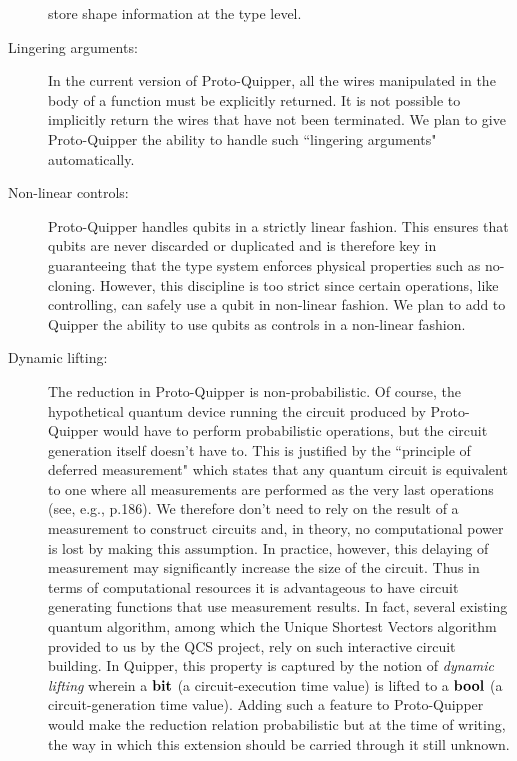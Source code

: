 \documentclass[twoside]{article}
\begin{document}
\begin{description}
    store shape information at the type level.
  \item[Lingering arguments:] In the current version of 
    Proto-Quipper, all the wires manipulated in the body of a function 
    must be explicitly returned. It is not possible to implicitly 
    return the wires that have not been terminated. We plan to 
    give Proto-Quipper the ability to handle such ``lingering 
    arguments" automatically.
  \item[Non-linear controls:] Proto-Quipper handles qubits 
    in a strictly linear fashion. This ensures that qubits are 
    never discarded or duplicated and is therefore key in 
    guaranteeing that the type system enforces physical properties 
    such as no-cloning. However, this discipline is too strict since 
    certain operations, like controlling, can safely use a qubit in 
    non-linear fashion. We plan to add to Quipper the ability to 
   use qubits as controls in a non-linear fashion.
  \item[Dynamic lifting:] The reduction in Proto-Quipper 
    is non-probabilistic. Of course, the hypothetical quantum 
    device running the circuit produced by Proto-Quipper would 
    have to perform probabilistic operations, but the circuit 
    generation itself doesn't have to. This is justified by the 
    ``principle of deferred measurement" which states that any 
    quantum circuit is equivalent to one where all measurements 
    are performed as the very last operations (see, e.g., 
    \cite{NC02} p.186). We therefore don't need to rely on the 
    result of a measurement to construct circuits and, in theory, 
    no computational power is lost by making this assumption. In 
    practice, however, this delaying of measurement may 
    significantly increase the size of the circuit. Thus in terms 
    of computational resources it is advantageous to have circuit 
    generating functions that use measurement results. In fact, 
    several existing quantum algorithm, among which the Unique
    Shortest Vectors
    algorithm provided to us by the QCS project, rely on such 
    interactive circuit building. In Quipper, this property is 
    captured by the notion of \emph{dynamic lifting} wherein a 
    $\textrm{\bf bit}$ (a circuit-execution time value) is lifted to a $\textrm{\bf bool}$ (a 
    circuit-generation time value). Adding such a feature to 
    Proto-Quipper would make the reduction relation probabilistic 
    but at the time of writing, the way in which this extension 
    should be carried through it still unknown. 
\end{description}
\end{document}
